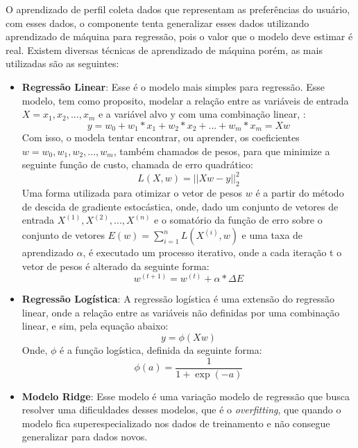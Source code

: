 O aprendizado de perfil coleta dados que representam as preferências do usuário, com esses dados, o componente tenta generalizar esses dados utilizando aprendizado de máquina para regressão, pois o valor que o modelo deve estimar é real. Existem diversas técnicas de aprendizado de máquina porém, as mais utilizadas são as seguintes:
\begin{itemize}
    \item \textbf{Regressão Linear}: Esse é o modelo mais simples para regressão. Esse modelo, tem como proposito, modelar a relação entre as variáveis de entrada \(X = x_1, x_2, ..., x_m\) e a variável alvo y com uma combinação linear,  \cite{bishop2006pattern}:
    \begin{equation}
        y = w_0 + w_1 * x_1 + w_2 * x_2 + ... + w_m * x_m = Xw
    \end{equation}
    Com isso, o modela tentar encontrar, ou aprender, os coeficientes \(w = w_0, w_1, w_2, ..., w_m\), também chamados de pesos, para que minimize a seguinte função de custo, chamada de erro quadrático:
     \begin{equation}
        L(X, w) = || Xw - y ||_{2}^{2}
    \end{equation}
    Uma forma utilizada para otimizar o vetor de pesos \(w\) é a partir do método de descida de gradiente estocástica, onde, dado um conjunto de vetores de entrada \(X^{(1)}, X^{(2)}, ..., X^{(n)}\) e o somatório da função de erro sobre o conjunto de vetores \(E(w) = \sum_{i=1}^{n} L(X^{(i)}, w)\) e uma taxa de aprendizado \(\alpha\), é executado um processo iterativo, onde a cada iteração t o vetor de pesos é alterado da seguinte forma:
    \begin{equation}
        w^{(t+1)} = w^{(t)} + \alpha * \Delta E 
    \end{equation}
    \item \textbf{Regressão Logística}: A regressão logística é uma extensão do regressão linear, onde a relação entre as variáveis não definidas por uma combinação linear, e sim, pela equação abaixo:
    \begin{equation}
        y = \phi(Xw)
    \end{equation}
    Onde, \(\phi\) é a função logística, definida da seguinte forma:
    \begin{equation}
        \phi(a) = \frac{1}{1 + \exp(-a)}
    \end{equation}
    \item \textbf{Modelo Ridge}: Esse modelo é uma variação modelo de regressão que busca resolver uma dificuldades desses modelos, que é o \textit{overfitting}, que quando o modelo fica superespecializado nos dados de treinamento e não consegue generalizar para dados novos\cite{Goodfellow-et-al-2016}.
    

\end{itemize}
